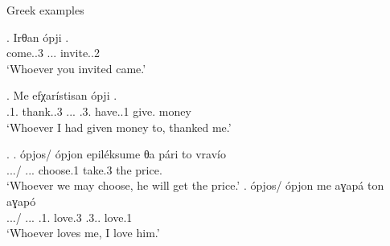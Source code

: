 \begin{frame}{Greek examples}

  \exg. Irθan ópji .\\
  come..3\scsub{[nom]} ... invite..2\scsub{[acc]}\\
  `Whoever you invited came.'\label{ex:greek-nom-acc}

  \exg. Me efχarístisan ópji    .\\
   .1. thank..3\scsub{[nom]} ... .3. have..1 give.\scsub{[gen]} money\\
   `Whoever I had given money to, thanked me.'\label{ex:greek-nom-gen}

   \ex.
   \ag. ópjos/ ópjon epiléksume θa pári to vravío\\
   .../ ... choose.1\scsub{[acc]}  take.3\scsub{[nom]} the price.\\
   `Whoever we may choose, he will get the price.'
   \bg. ópjos/ ópjon me aɣapá ton aɣapó\\
   .../ ... .1. love.3\scsub{[nom]}
   .3.. love.1\scsub{[acc]}\\
   `Whoever loves me, I love him.' 

\end{frame}

